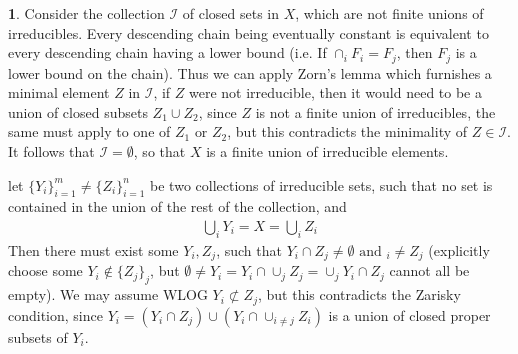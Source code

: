 \documentclass[11pt]{article}
\theoremstyle{definition}
\newtheorem{pb}{}
\newcommand{\set}[1]{\{#1\}}
\newcommand{\tand}[1]{\text{ and }}
\newcommand{\tor}[1]{\text{ or }}
\begin{document}
    \begin{pb}
        Consider the collection \(\mathcal{I}\) of closed sets in \(X\), which are not finite unions of irreducibles. Every descending chain being eventually constant is equivalent to every descending chain having a lower bound
        (i.e. If \(\cap_i F_i = F_j\), then \(F_j\) is a lower bound on the chain).
        Thus we can apply Zorn's lemma which furnishes a minimal element \(Z\) in \(\mathcal{I}\), if \(Z\) were not irreducible, then it would need to be a union of closed subsets \(Z_1\cup Z_2\),
        since \(Z\) is not a finite union of irreducibles, the same must apply to one of \(Z_1 \tor ZZ_2\), but this contradicts the minimality of \(Z \in \mathcal{I}\). It follows that
        \(\mathcal{I} = \emptyset\), so that \(X\) is a finite union of irreducible elements.

        let \(\set{Y_i}_{i = 1}^m \neq \set{Z_i}_{i = 1}^n\) be two collections
        of irreducible sets, such that no set is contained in the union of the rest of the collection, and
        \begin{align*}
            \bigcup_i Y_i = X = \bigcup_i Z_i
        \end{align*}
        Then there must exist some \(Y_i, Z_j\), such that \(Y_i \cap Z_j \neq \emptyset \tand Y_i \neq Z_j\)
        (explicitly choose some \(Y_i \not \in \set{Z_j}_j\), but \(\emptyset \neq Y_i = Y_i \cap \cup_j Z_j = \cup_j Y_i \cap Z_j\)
         cannot all be empty). We may assume WLOG \(Y_i \not \subset Z_j\), but this contradicts the Zarisky condition, since 
        \(Y_i = (Y_i \cap Z_j) \cup (Y_i \cap \cup_{i \neq j}Z_i)\) is a union of closed proper subsets of \(Y_i\).
    \end{pb}
\end{document}
